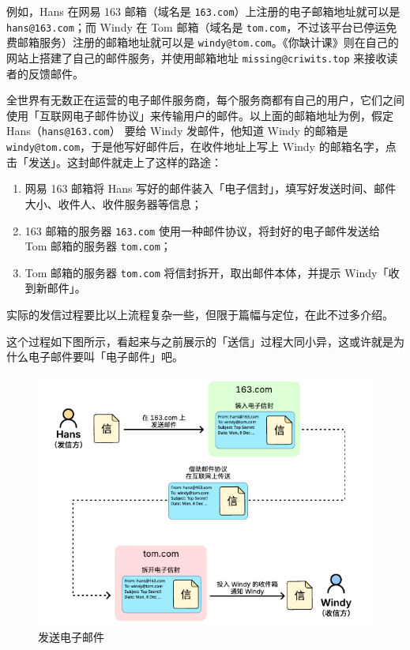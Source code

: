 例如，Hans 在网易 163 邮箱（域名是 \texttt{163.com}）上注册的电子邮箱地址就可以是 \texttt{hans@163.com}\MailExample；而 Windy 在 Tom 邮箱（域名是 \texttt{tom.com}，不过该平台已停运免费邮箱服务）注册的邮箱地址就可以是 \texttt{windy@tom.com}\MailExample。《你缺计课》则在自己的网站上搭建了自己的邮件服务，并使用邮箱地址 \texttt{missing@criwits.top} 来接收读者的反馈邮件。

全世界有无数正在运营的电子邮件服务商，每个服务商都有自己的用户，它们之间使用「互联网电子邮件协议」来传输用户的邮件。以上面的邮箱地址为例，假定 Hans（\texttt{hans@163.com}） 要给 Windy 发邮件，他知道 Windy 的邮箱是 \texttt{windy@tom.com}，于是他写好邮件后，在收件地址上写上 Windy 的邮箱名字，点击「发送」。这封邮件就走上了这样的路途：

\begin{enumerate}
  \item 网易 163 邮箱将 Hans 写好的邮件装入「电子信封」，填写好发送时间、邮件大小、收件人、收件服务器等信息；
  \item 163 邮箱的服务器 \texttt{163.com} 使用一种邮件协议，将封好的电子邮件发送给 Tom 邮箱的服务器 \texttt{tom.com}；
  \item Tom 邮箱的服务器 \texttt{tom.com} 将信封拆开，取出邮件本体，并提示 Windy「收到新邮件」。
\end{enumerate}

\begin{note}
  实际的发信过程要比以上流程复杂一些，但限于篇幅与定位，在此不过多介绍。
\end{note}

这个过程如下图所示，看起来与之前展示的「送信」过程大同小异，这或许就是为什么电子邮件要叫「电子邮件」吧。

\begin{figure}[htb!]
  \centering
  \includegraphics[width=.7\textwidth]{assets/software/E_mail.pdf}
  \caption{发送电子邮件}
  \label{fig:E_mail}
\end{figure}

